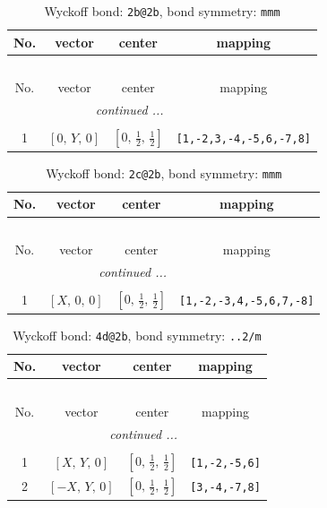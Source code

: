 \documentclass[fleqn,8pt]{jsarticle}
\begin{document}
\begin{longtable}{cccc}
\caption{Wyckoff bond: {\tt 2b@2b}, bond symmetry: {\tt mmm}}
 \\
 \hline \hline
No. & vector & center & mapping \\ \hline \endfirsthead

\multicolumn{3}{l}{\tablename\ \thetable{}} \\
 \hline \hline
No. & vector & center & mapping \\ \hline \endhead

 \hline \hline
\multicolumn{3}{r}{\footnotesize\it continued ...} \\ \endfoot

 \hline \hline
\multicolumn{3}{r}{} \\ \endlastfoot

1 & $\left[ 0,\, Y,\, 0 \right]$ & $\left[ 0,\, \frac{1}{2},\, \frac{1}{2} \right]$ & {\tt [1,-2,3,-4,-5,6,-7,8]} \\
\end{longtable}
\renewcommand{\arraystretch}{1.2}
\begin{longtable}{cccc}
\caption{Wyckoff bond: {\tt 2c@2b}, bond symmetry: {\tt mmm}}
 \\
 \hline \hline
No. & vector & center & mapping \\ \hline \endfirsthead

\multicolumn{3}{l}{\tablename\ \thetable{}} \\
 \hline \hline
No. & vector & center & mapping \\ \hline \endhead

 \hline \hline
\multicolumn{3}{r}{\footnotesize\it continued ...} \\ \endfoot

 \hline \hline
\multicolumn{3}{r}{} \\ \endlastfoot

1 & $\left[ X,\, 0,\, 0 \right]$ & $\left[ 0,\, \frac{1}{2},\, \frac{1}{2} \right]$ & {\tt [1,-2,-3,4,-5,6,7,-8]} \\
\end{longtable}
\renewcommand{\arraystretch}{1.2}
\begin{longtable}{cccc}
\caption{Wyckoff bond: {\tt 4d@2b}, bond symmetry: {\tt ..2/m}}
 \\
 \hline \hline
No. & vector & center & mapping \\ \hline \endfirsthead

\multicolumn{3}{l}{\tablename\ \thetable{}} \\
 \hline \hline
No. & vector & center & mapping \\ \hline \endhead

 \hline \hline
\multicolumn{3}{r}{\footnotesize\it continued ...} \\ \endfoot

 \hline \hline
\multicolumn{3}{r}{} \\ \endlastfoot

1 & $\left[ X,\, Y,\, 0 \right]$ & $\left[ 0,\, \frac{1}{2},\, \frac{1}{2} \right]$ & {\tt [1,-2,-5,6]} \\ \hline
2 & $\left[ - X,\, Y,\, 0 \right]$ & $\left[ 0,\, \frac{1}{2},\, \frac{1}{2} \right]$ & {\tt [3,-4,-7,8]} \\
\end{longtable}
\end{document}
